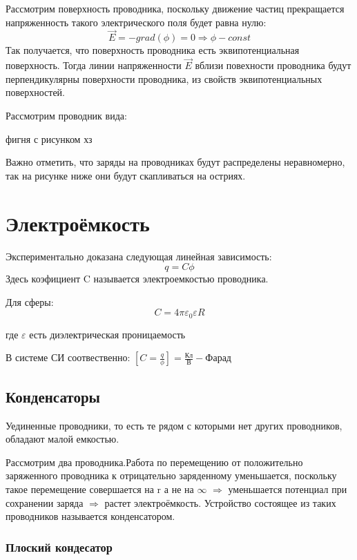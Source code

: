 \documentclass[../main.tex]{subfiles}
\begin{document}
Рассмотрим поверхность проводника, поскольку движение частиц прекращается напряженность такого электрического поля будет равна нулю:
\[\vec E = - grad(\phi) = 0 \Rightarrow \phi - const \]
Так получается, что поверхность проводника есть эквипотенциальная поверхность. Тогда линии напряженности $\vec E$ вблизи
повехности проводника будут перпендикулярны поверхности проводника, из свойств эквипотенциальных поверхностей.

Рассмотрим проводник вида:


фигня с рисунком хз 



Важно отметить, что заряды на проводниках будут распределены неравномерно, так на рисунке ниже они будут скапливаться на остриях.

\section{Электроёмкость}
Экспериментально доказана следующая линейная зависимость:
\[q = C \phi\]
Здесь коэфициент C называется электроемкостью проводника.

Для сферы:
\[ C = 4 \pi \varepsilon_0 \varepsilon R\]
\begin{center}
    где $\varepsilon$ есть диэлектрическая проницаемость
\end{center}
В системе СИ соотвественно: $[C = \frac{q}{\phi}] = \frac{\text{Кл}}{\text{В}} - Фарад$
\subsection{Конденсаторы}
Уединенные проводники, то есть те рядом с которыми нет других проводников, обладают малой емкостью.

Рассмотрим два проводника.Работа по перемещению от положительно заряженного проводника к отрицательно заряденному уменьшается, поскольку
такое перемещение совершается на r а не на $\infty$ $\Rightarrow$ уменьшается потенциал при сохранении заряда $\Rightarrow$
растет электроёмкость.
Устройство состоящее из таких проводников называется конденсатором.


\subsubsection{Плоский кондесатор}
\end{document}
